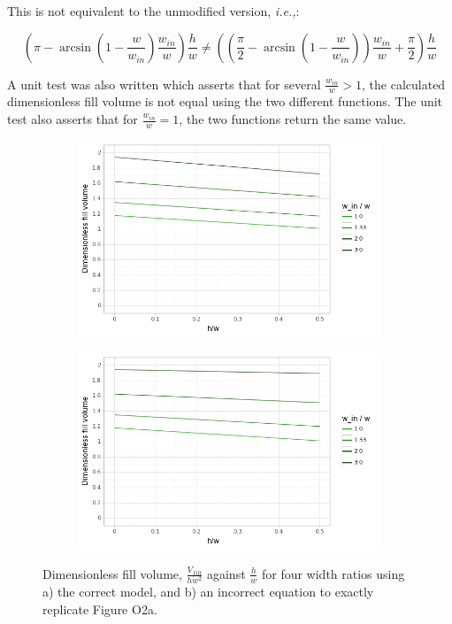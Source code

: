\noindent This is not equivalent to the unmodified version, \emph{i.e.,}:

$$
\left(\pi -
\arcsin\left(1 - \frac{w}{w_{in}}\right)\frac{w_{in}}{w}
\right)\frac{h}{w}
\neq
\left(\left(\frac{\pi}{2} -
\arcsin\left(1 - \frac{w}{w_{in}}\right)\right)\frac{w_{in}}{w} +
\frac{\pi}{2}\right)\frac{h}{w}
$$

\noindent A unit test was also written which asserts that for several $\frac{w_{in}}{w}>1$, the 
calculated dimensionless fill volume is not equal using the two different functions.
The unit test also asserts that for $\frac{w_{in}}{w}=1$, the two functions return
the same value.

\begin{figure}[ht]
  \centering
  \begin{subfigure}[b]{0.4\linewidth}
    \includegraphics[width=\linewidth]{../figures/fig_2a.png}
    \caption{}
    \label{fig2a}
  \end{subfigure}
  \begin{subfigure}[b]{0.4\linewidth}
    \includegraphics[width=\linewidth]{../figures/fig_2a_incorrect.png}
    \caption{}
    \label{fig2a_bad}
  \end{subfigure}
  \caption{Dimensionless fill volume, $\frac{V_{fill}}{hw^2}$ against $\frac{h}{w}$
  for four width ratios using a) the correct model, and b) an
  incorrect equation to exactly replicate Figure O2a.}
\end{figure}

